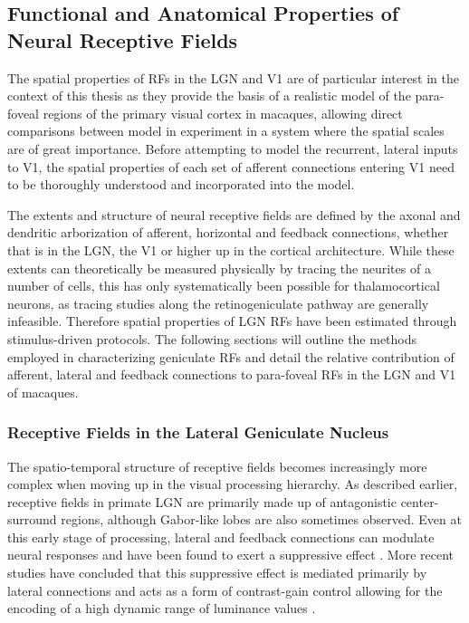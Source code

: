 \subsection{Functional and Anatomical Properties of Neural Receptive Fields}

The spatial properties of RFs in the LGN and V1 are of particular
interest in the context of this thesis as they provide the basis of a
realistic model of the para-foveal regions of the primary visual
cortex in macaques, allowing direct comparisons between model in
experiment in a system where the spatial scales are of great
importance. Before attempting to model the recurrent, lateral inputs
to V1, the spatial properties of each set of afferent connections
entering V1 need to be thoroughly understood and incorporated into the
model.

The extents and structure of neural receptive fields are defined by
the axonal and dendritic arborization of afferent, horizontal and
feedback connections, whether that is in the LGN, the V1 or higher up
in the cortical architecture. While these extents can theoretically be
measured physically by tracing the neurites of a number of cells, this
has only systematically been possible for thalamocortical
neurons, as tracing studies along the retinogeniculate
pathway are generally infeasible. Therefore spatial properties of LGN
RFs have been estimated through stimulus-driven protocols. The
following sections will outline the methods employed in characterizing
geniculate RFs and detail the relative contribution of afferent,
lateral and feedback connections to para-foveal RFs in the LGN and V1
of macaques.

\subsubsection{Receptive Fields in the Lateral Geniculate Nucleus}
\label{sec:LGNRF}

The spatio-temporal structure of receptive fields becomes increasingly
more complex when moving up in the visual processing hierarchy. As
described earlier, receptive fields in primate LGN are primarily made up
of antagonistic center-surround regions, although Gabor-like lobes are
also sometimes observed. Even at this early stage of processing,
lateral and feedback connections can modulate neural responses and
have been found to exert a suppressive effect \citep{Hubel1961}. More
recent studies have concluded that this suppressive effect is mediated
primarily by lateral connections and acts as a form of contrast-gain
control allowing for the encoding of a high dynamic range of luminance
values \citep{Bonin2005}.

